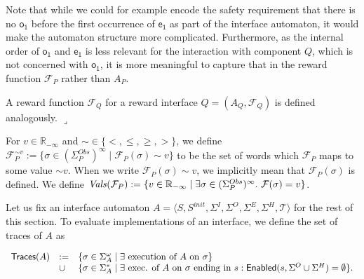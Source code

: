  
 
Note that while we could for example encode the safety requirement that there is no $\mathsf{o_{1}}$ before the first occurrence of $\mathsf{e_{1}}$ as part of the interface automaton, it would make the automaton structure more complicated. Furthermore, as the internal order of $\mathsf{o_{1}}$ and $\mathsf{e_{1}}$ is less relevant for the interaction with component $Q$, which is not concerned with $\mathsf{o_{1}}$, it is more meaningful to capture that in the reward function $\mathcal{F}_{P}$ rather than $A_{P}$.\par
 
 
 
A reward function $\mathcal{F}_{Q}$ for a reward interface $Q=(A_{Q},\mathcal{F}_{Q})$ is defined analogously. $\lrcorner$\par
 
 
 
 
For $v\in\mathbb{R}_{-\infty}$ and $\sim\in\{<,\leq,\geq,>\}$, we define $\mathcal{F}_{P}^{\sim v}:=\{\sigma\in(\Sigma^{Obs}_{P})^{\infty}\mid\mathcal{F}_{P}(\sigma)\sim v\}$ to be the set of words which $\mathcal{F}_{P}$ maps to some value $\sim v$. When we write $\mathcal{F}_{P}(\sigma)\sim v$, we implicitly mean that $\mathcal{F}_{P}(\sigma)$ is defined. We define $\mathit{Vals}(\mathcal{F}_{P}):=\{v\in\mathbb{R}_{-\infty}\mid\exists\sigma\in(\Sigma^{Obs}_{P})^{\infty}.\nobreak\ \mathcal{F}(\sigma)=v\}$.\par
 
 
 
Let us fix an interface automaton $A=\langle S,S^{init},\Sigma^{I},\Sigma^{O},\Sigma^{E},\Sigma^{H},\mathcal{T}\rangle$ for the rest of this section. To evaluate implementations of an interface, we define the set of traces of $A$ as\par
  
\par  \quad  \[\begin{array}[]{lll}\mathsf{Traces}(A)&:=&\{\sigma\in\Sigma_{A}^{\omega}\mid\exists\nobreak\ \text{execution of }A\text{ on }\sigma\}\\
&\cup&\{\sigma\in\Sigma_{A}^{*}\mid\exists\nobreak\ \text{exec. of }A\text{ on }\sigma\text{ ending in }s:\mathsf{Enabled}(s,\Sigma^{O}\cup\Sigma^{H})=\emptyset\}.\end{array}\]\quad  \quad  
  
